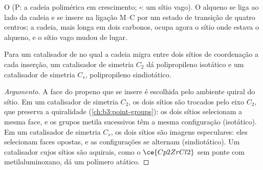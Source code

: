 \begin{omfigure}
\par\medskip

{\small O  (P: a cadeia polimérica em crescimento; $\square$: um
sítio vago). O alqueno se liga ao lado da cadeia e se insere na ligação M--C
por um estado de transição de quatro centros; a cadeia, mais longa em dois
carbonos, ocupa agora o sítio onde estava o alqueno, e o sítio vago
mudou de lugar.}
\end{omfigure}

\begin{proposition}\label{prop:b3:homogeneous-catalysis:tacticity-symmetry}
Para um catalisador de  no qual a cadeia migra entre dois sítios de
coordenação a cada inserção, um catalisador de simetria $C_2$ dá polipropileno
isotático e um catalisador de simetria $C_s$, polipropileno sindiotático.
\end{proposition}

\begin{proof}[Argumento]
A face do propeno que se insere é escolhida pelo ambiente quiral do
sítio. Em um catalisador de simetria $C_2$, os dois sítios são trocados pelo eixo $C_2$,
que preserva a quiralidade (\cref{ch:b3:point-groups}): os dois sítios selecionam a
mesma face, e os grupos metila sucessivos têm a mesma configuração (isotático).
Em um catalisador de simetria $C_s$, os dois sítios são imagens especulares: eles selecionam faces
opostas, e as configurações se alternam (sindiotático). Um catalisador cujos sítios
são aquirais, como o $\ce{Cp2ZrCl2}$ sem ponte com metilaluminoxano, dá um polímero
atático.
\end{proof}

